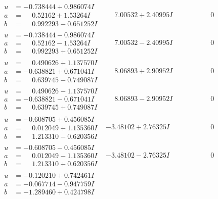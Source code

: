 \documentclass[1p]{elsarticle_modified}
\theoremstyle{definition}
\begin{document}
$$\begin{array}{c|c|c}
\begin{aligned}
u &= -0.738444 + 0.986074 I \\
a &= \phantom{-}0.52162 + 1.53264 I \\
b &= \phantom{-}0.992293 - 0.651252 I\end{aligned}
 & \phantom{-}7.00532 + 2.40995 I & \phantom{-0.000000 } 0 \\ \hline\begin{aligned}
u &= -0.738444 - 0.986074 I \\
a &= \phantom{-}0.52162 - 1.53264 I \\
b &= \phantom{-}0.992293 + 0.651252 I\end{aligned}
 & \phantom{-}7.00532 - 2.40995 I & \phantom{-0.000000 } 0 \\ \hline\begin{aligned}
u &= \phantom{-}0.490626 + 1.137570 I \\
a &= -0.638821 + 0.671041 I \\
b &= \phantom{-}0.639745 - 0.749087 I\end{aligned}
 & \phantom{-}8.06893 + 2.90952 I & \phantom{-0.000000 } 0 \\ \hline\begin{aligned}
u &= \phantom{-}0.490626 - 1.137570 I \\
a &= -0.638821 - 0.671041 I \\
b &= \phantom{-}0.639745 + 0.749087 I\end{aligned}
 & \phantom{-}8.06893 - 2.90952 I & \phantom{-0.000000 } 0 \\ \hline\begin{aligned}
u &= -0.608705 + 0.456085 I \\
a &= \phantom{-}0.012049 + 1.135360 I \\
b &= \phantom{-}1.213310 - 0.620356 I\end{aligned}
 & -3.48102 + 2.76325 I & \phantom{-0.000000 } 0 \\ \hline\begin{aligned}
u &= -0.608705 - 0.456085 I \\
a &= \phantom{-}0.012049 - 1.135360 I \\
b &= \phantom{-}1.213310 + 0.620356 I\end{aligned}
 & -3.48102 - 2.76325 I & \phantom{-0.000000 } 0 \\ \hline\begin{aligned}
u &= -0.120210 + 0.742461 I \\
a &= -0.067714 - 0.947759 I \\
b &= -1.289460 + 0.424798 I\end{aligned}

\end{array}$$
\end{document}
